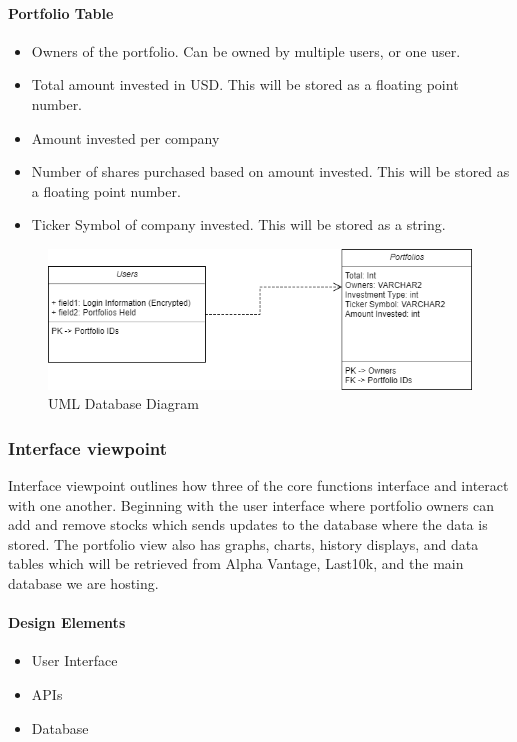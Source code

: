 \documentclass[onecolumn, draftclsnofoot,10pt, compsoc]{IEEEtran}
\begin{document}
\paragraph{Portfolio Table}
\begin{itemize}
    \item Owners of the portfolio. Can be owned by multiple users, or one user.
    \item Total amount invested in USD. This will be stored as a floating point number.
    \item Amount invested per company
    \item Number of shares purchased based on amount invested. This will be stored as a floating point number.
    \item Ticker Symbol of company invested. This will be stored as a string.

\end{itemize}

\begin{figure}[h]
\centering
\captionsetup{justification=centering}
\includegraphics[width=14cm]{design/database.png}
\caption{UML Database Diagram}
\end{figure}

\subsubsection{Interface viewpoint}

    Interface viewpoint outlines how three of the core functions interface and interact with one another.
    Beginning with the user interface where portfolio owners can add and remove stocks which sends updates to the database where the data is stored. The portfolio view also has graphs, charts, history displays,
    and data tables which will be retrieved from Alpha Vantage, Last10k, and the main database we are hosting. 
    
\paragraph{Design Elements}
    \begin{itemize}
        \item User Interface
        \item APIs
        \item Database
    \end{itemize}
\end{document}
